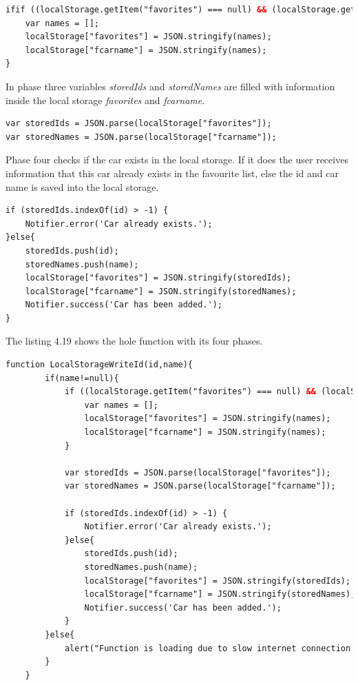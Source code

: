 \begin{lstlisting}[language=html, caption= 
Phase two,captionpos=b]
ifif ((localStorage.getItem("favorites") === null) && (localStorage.getItem("fcarname") == null)) {
	var names = [];
	localStorage["favorites"] = JSON.stringify(names);
	localStorage["fcarname"] = JSON.stringify(names);
}
\end{lstlisting}

In phase three variables \textit{storedIds} and \textit{storedNames} are filled with information inside the local storage \textit{favorites} and \textit{fcarname}.
\\

\begin{lstlisting}[language=html, caption= 
Phase three,captionpos=b]
var storedIds = JSON.parse(localStorage["favorites"]);
var storedNames = JSON.parse(localStorage["fcarname"]);
\end{lstlisting}

Phase four checks if the car exists in the local storage. If it does the user receives information that this car already exists in the favourite list, else the id and car name is saved into the local storage.
\\

\begin{lstlisting}[language=html, caption= 
Phase four,captionpos=b]
if (storedIds.indexOf(id) > -1) {
	Notifier.error('Car already exists.');
}else{
	storedIds.push(id);
	storedNames.push(name);
	localStorage["favorites"] = JSON.stringify(storedIds);
	localStorage["fcarname"] = JSON.stringify(storedNames);
	Notifier.success('Car has been added.');
}
\end{lstlisting}

The listing 4.19 shows the hole function with its four phases.
\begin{lstlisting}[language=html, caption= 
Save car function,captionpos=b]
function LocalStorageWriteId(id,name){
		if(name!=null){
			if ((localStorage.getItem("favorites") === null) && (localStorage.getItem("fcarname") == null)) {
				var names = [];
				localStorage["favorites"] = JSON.stringify(names);
				localStorage["fcarname"] = JSON.stringify(names);
			}
			
			var storedIds = JSON.parse(localStorage["favorites"]);
			var storedNames = JSON.parse(localStorage["fcarname"]);
		
			if (storedIds.indexOf(id) > -1) {
				Notifier.error('Car already exists.');
			}else{
				storedIds.push(id);
				storedNames.push(name);
				localStorage["favorites"] = JSON.stringify(storedIds);
				localStorage["fcarname"] = JSON.stringify(storedNames);
				Notifier.success('Car has been added.');
			}
		}else{
			alert("Function is loading due to slow internet connection.");
		}
    }
\end{lstlisting}




